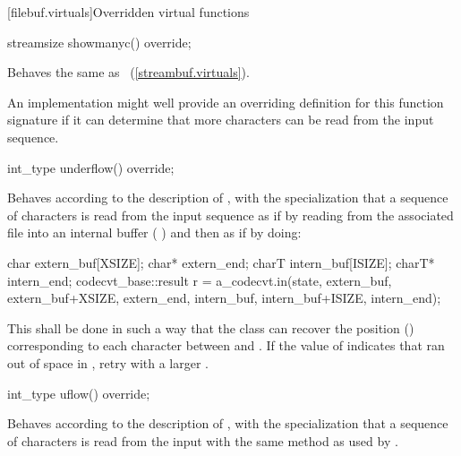 [filebuf.virtuals]{Overridden virtual functions}

%
\begin{itemdecl}
streamsize showmanyc() override;
\end{itemdecl}

\begin{itemdescr}
\pnum
\effects
Behaves the same as
~(\ref{streambuf.virtuals}).
%

\pnum
\remarks
An
implementation might well provide an overriding definition for this function
signature if it can determine that more characters can be read from the input
sequence.
\end{itemdescr}

%
\begin{itemdecl}
int_type underflow() override;
\end{itemdecl}

\begin{itemdescr}
\pnum
\effects
Behaves according to the description of
,
with the specialization that a sequence of characters is read from the input
sequence as if by reading from the associated file
into an internal buffer (
)
and then as if by doing:

\begin{codeblock}
char   extern_buf[XSIZE];
char*  extern_end;
charT  intern_buf[ISIZE];
charT* intern_end;
codecvt_base::result r =
  a_codecvt.in(state, extern_buf, extern_buf+XSIZE, extern_end,
               intern_buf, intern_buf+ISIZE, intern_end);
\end{codeblock}

This shall be done in such a way that the class can recover the
position
()
corresponding to each character between
and
.
If the value of
indicates that
ran out of space in
,
retry with a larger
.
\end{itemdescr}

%
\begin{itemdecl}
int_type uflow() override;
\end{itemdecl}

\begin{itemdescr}
\pnum
\effects
Behaves according to the description of
,
with the specialization that a sequence of characters is read from the input
with the same method as used by
.
\end{itemdescr}

